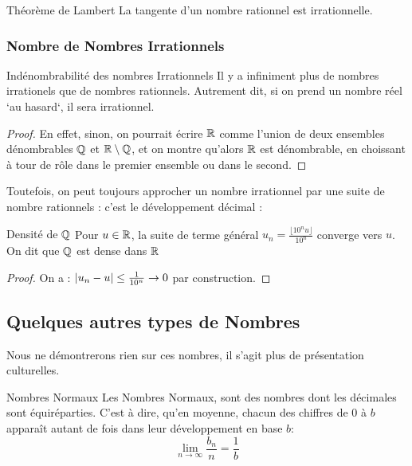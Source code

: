 \documentclass{cours}
\begin{document}
    \begin{corollaire}{Théorème de Lambert}{}
        La tangente d'un nombre rationnel est irrationnelle.
    \end{corollaire}

    \subsubsection{Nombre de Nombres Irrationnels}
    \begin{théorème}{Indénombrabilité des nombres Irrationnels}{}
        Il y a infiniment plus de nombres irrationels que de nombres rationnels. Autrement dit, si on prend un nombre réel `au hasard`, il sera irrationnel.
    \end{théorème}
    \begin{proof}
        En effet, sinon, on pourrait écrire $\mathbb{R}$ comme l'union de deux ensembles dénombrables $\mathbb{Q}$ et $\mathbb{R}\setminus\mathbb{Q}$, et on montre qu'alors $\mathbb{R}$ est dénombrable, en choissant à tour de rôle dans le premier ensemble ou dans le second.
    \end{proof}

    Toutefois, on peut toujours approcher un nombre irrationnel par une suite de nombre rationnels : c'est le développement décimal :
    
    \begin{théorème}{Densité de $\mathbb{Q}$}{}
        Pour $u \in \mathbb{R}$, la suite de terme général $u_{n} = \frac{\lfloor 10^{n}u\rfloor}{10^{n}}$ converge vers $u$. On dit que $\mathbb{Q}$ est dense dans $\mathbb{R}$
    \end{théorème}
    \begin{proof}
        On a : $\left|u_{n} - u\right| \leq \frac{1}{10^{n}} \to 0$ par construction.
    \end{proof}

    \subsection{Quelques autres types de Nombres}
    Nous ne démontrerons rien sur ces nombres, il s'agit plus de présentation culturelles.
    \begin{définition}{Nombres Normaux}{}
        Les Nombres Normaux, sont des nombres dont les décimales sont équiréparties. C'est à dire, qu'en moyenne, chacun des chiffres de $0$ à $b$ apparaît autant de fois dans leur développement en base $b$: 
    \[
        \lim_{n \to \infty} \frac{b_{n}}{n} = \frac{1}{b}
    \]        
    \end{définition}
\end{document}
